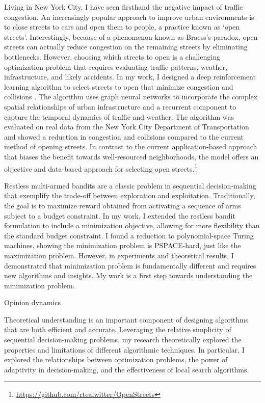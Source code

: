 \documentclass[11pt]{article}
\begin{document}
Living in New York City, I have seen firsthand the negative impact of traffic congestion.
An increasingly popular approach to improve urban environments is to close streets to cars and open them to people, a practice known as `open streets'.
Interestingly, because of a phenomenon known as Braess's paradox, open streets can actually reduce congestion on the remaining streets by eliminating bottlenecks.
However, choosing which streets to open is a challenging optimization problem that requires evaluating traffic patterns, weather, infrastructure, and likely accidents.
In my work, I designed a deep reinforcement learning algorithm to select streets to open that minimize congestion and collisions \cite{witter2024i}.
The algorithm uses graph neural networks to incorporate the complex spatial relationships of urban infrastructure and a recurrent component to capture the temporal dynamics of traffic and weather.
The algorithm was evaluated on real data from the New York City Department of Transportation and showed a reduction in congestion and collisions compared to the current method of opening streets.
In contrast to the current application-based approach that biases the benefit towards well-resourced neighborhoods, the model offers an objective and data-based approach for selecting open streets.\footnote{\url{https://github.com/rtealwitter/OpenStreets}}

Restless multi-armed bandits are a classic problem in sequential decision-making that exemplify the trade-off between exploration and exploitation.
Traditionally, the goal is to maximize reward obtained from activating a sequence of arms subject to a budget constraint.
In my work, I extended the restless bandit formulation to include a minimization objective, allowing for more flexibility than the standard budget constraint.
I found a reduction to polynomial-space Turing machines, showing the minimization problem is PSPACE-hard, just like the maximization problem.
However, in experiments and theoretical results, I demonstrated that minimization problem is fundamentally different and requires new algorithms and insights.
My work is a first step towards understanding the minimization problem.

Opinion dynamics \cite{musco2022quantify}


Theoretical understanding is an important component of designing algorithms that are both efficient and accurate.
Leveraging the relative simplicity of sequential decision-making problems, my research theoretically explored the properties and limitations of different algorithmic techniques.
In particular, I explored the relationships between optimization problems, the power of adaptivity in decision-making, and the effectiveness of local search algorithms.
\end{document}
